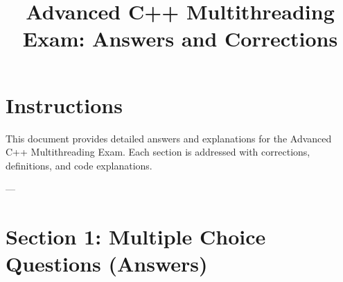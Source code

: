 \documentclass[12pt]{article}
\title{Advanced C++ Multithreading Exam: Answers and Corrections}
\author{}
\date{}
\begin{document}
\maketitle

\section*{Instructions}
This document provides detailed answers and explanations for the Advanced C++ Multithreading Exam. Each section is addressed with corrections, definitions, and code explanations.

---

\section*{Section 1: Multiple Choice Questions (Answers)}
\end{document}
